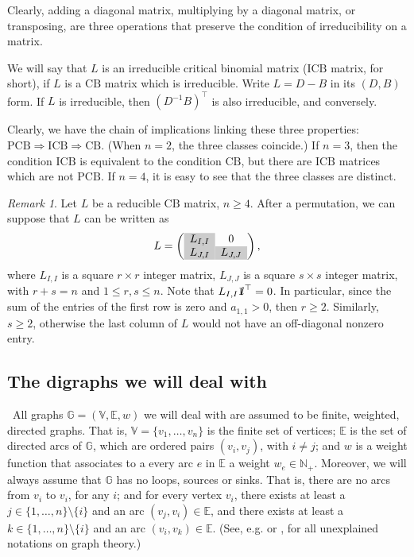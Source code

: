 \documentclass[10pt]{amsart}
\newcommand{\eg}{e.g.}
\newcommand{\y}{\cellcolor{gray!40}}
\newcommand{\mbn}{\mbox{$\mathbb{N}$}}
\newcommand{\mbg}{\mbox{$\mathbb{G}$}}
\newcommand{\mbv}{\mbox{$\mathbb{V}$}}
\newcommand{\mbe}{\mbox{$\mathbb{E}$}}
\newcommand{\mbone}{\mbox{$1\mkern-4.6mu {\rm l}$}}
\newcommand{\icb}{\mbox{$\mathrm{ICB}$}}
\newcommand{\pcb}{\mbox{$\mathrm{PCB}$}}
\newcommand{\cb}{\mbox{$\mathrm{CB}$}}
\theoremstyle{definition}
\theoremstyle{remark}
\newtheorem{remark}[cdrthm]{Remark}
\begin{document}
Clearly, adding a diagonal matrix, multiplying by a diagonal matrix,
or transposing, are three operations that preserve the condition of
irreducibility on a matrix.

We will say that $L$ is an irreducible critical binomial matrix
($\icb$ matrix, for short), if $L$ is a $\cb$ matrix which is
irreducible. Write $L=D-B$ in its $(D,B)$ form. If $L$ is irreducible,
then $(D^{-1}B)^{\top}$ is also irreducible, and conversely.

Clearly, we have the chain of implications linking these three
properties: $\pcb\Rightarrow\icb\Rightarrow\cb$. (When $n=2$, the
three classes coincide.) If $n=3$, then the condition $\icb$ is
equivalent to the condition $\cb$, but there are $\icb$ matrices which
are not $\pcb$. If $n=4$, it is easy to see that the three classes are
distinct.

\begin{remark}\label{remarkreducedform}
Let $L$ be a reducible $\cb$ matrix, $n\geq 4$. After a permutation,
we can suppose that $L$ can be written as
\begin{eqnarray}\label{eqreducedform}
L=\left(\begin{array}{cc} 
\y L_{I,I}&0\\
\y L_{J,I}&\y L_{J,J}
\end{array}\right),
\end{eqnarray}
where $L_{I,I}$ is a square $r\times r$ integer matrix, $L_{J,J}$ is a
square $s\times s$ integer matrix, with $r+s=n$ and $1\leq r,s\leq n$.
Note that $L_{I,I}\mbone^{\top}=0$. In particular, since the sum of
the entries of the first row is zero and $a_{1,1}>0$, then $r\geq
2$. Similarly, $s\geq 2$, otherwise the last column of $L$ would not
have an off-diagonal nonzero entry.
\end{remark}

\subsection{The digraphs we will deal with}

\ All graphs $\mbg=(\mbv,\mbe,w)$ we will deal with are
assumed to be finite, weighted, directed graphs. That is,
$\mbv=\{v_1,\ldots ,v_n\}$ is the finite set of vertices; $\mbe$ is
the set of directed arcs of $\mbg$, which are ordered pairs
$(v_i,v_j)$, with $i\neq j$; and $w$ is a weight function that
associates to a every arc $e$ in $\mbe$ a weight
$w_e\in\mbn_+$. Moreover, we will always assume that $\mbg$ has no
loops, sources or sinks. That is, there are no arcs from $v_i$ to
$v_i$, for any $i$; and for every vertex $v_i$, there exists at least
a $j\in\{1,\ldots,n\}\setminus\{i\}$ and an arc $(v_j,v_i)\in \mbe$,
and there exists at least a $k\in\{1,\ldots,n\}\setminus\{i\}$ and an
arc $(v_i,v_k)\in \mbe$.  (See, \eg \cite{br} or \cite{gr}, for all
unexplained notations on graph theory.)
\end{document}
